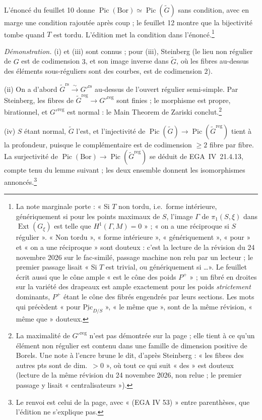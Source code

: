 \documentclass[11pt,a4paper]{article}
\begin{document}
L'énoncé du feuillet 10 donne
$\operatorname{Pic}(\mathrm{Bor})\simeq\operatorname{Pic}(\widetilde{G})$ sans
condition, avec en marge une condition rajoutée après coup ; le feuillet 12
montre que la bijectivité tombe quand $T$ est tordu. L'édition met la condition
dans l'énoncé.\footnote{La note marginale porte : « Si $T$
non tordu, i.e.\ forme intérieure, génériquement si pour les points maximaux
de $S$, l'image $\Gamma$ de $\pi_{1}(S,\xi)$ dans
$\operatorname{Ext}(G_{\xi})$ est telle que $H^{1}(\Gamma,M)=0$ » ; « on a une
réciproque si $S$ régulier ». « Non tordu », « forme intérieure »,
« génériquement », « pour » et « on a une réciproque » sont douteux : c'est la
lecture de la révision du 24 novembre 2026 sur le fac-similé,
passage machine non relu par un lecteur ; le premier passage lisait
« Si $T$ est trivial, ou génériquement si \ldots ». Le feuillet écrit aussi que le cône ample « est
le cône des poids $P^{+}$ » ; un fibré en droites sur la variété des drapeaux
est ample exactement pour les poids \emph{strictement} dominants, $P^{+}$ étant
le cône des fibrés engendrés par leurs sections. Les mots qui précèdent « pour
$\underline{\mathrm{Pic}}_{D/S}$ », « le même que », sont de la même révision,
« même que » douteux.}

\emph{Démonstration.} (i) et (iii) sont connus ; pour (iii), Steinberg (le
lieu non régulier de $G$ est de codimension $3$, et son image inverse dans
$\widetilde{G}$, où les fibres au-dessus des éléments sous-réguliers sont des
courbes, est de codimension $2$).

(ii) On a d'abord $\widetilde{G}^{\mathrm{rs}}\xrightarrow{\sim}
G'^{\mathrm{rs}}$ au-dessus de l'ouvert régulier semi-simple. Par Steinberg,
les fibres de $\widetilde{G}^{\mathrm{reg}}\to G'^{\mathrm{reg}}$ sont finies ;
le morphisme est propre, birationnel, et $G'^{\mathrm{reg}}$ est normal : le
Main Theorem de Zariski conclut.\footnote{La maximalité de
$G'^{\mathrm{reg}}$ n'est pas démontrée sur la page ; elle tient à ce qu'un
élément non régulier est contenu dans une famille de dimension positive de
Borels. Une note à l'encre brune le dit, d'après Steinberg : « les fibres des autres
pts sont de dim.\ $> 0$ », où tout ce qui suit « des » est douteux (lecture de
la même révision du 24 novembre 2026, non relue ; le premier passage y lisait
« centralisateurs »).}

(iv) $S$ étant normal, $\widetilde{G}$ l'est, et l'injectivité de
$\operatorname{Pic}(\widetilde{G})\to\operatorname{Pic}(\widetilde{G}^{\mathrm{reg}})$
tient à la profondeur, puisque le complémentaire est de codimension
$\geqslant 2$ fibre par fibre. La surjectivité de
$\operatorname{Pic}(\mathrm{Bor})\to\operatorname{Pic}(\widetilde{G}^{\mathrm{reg}})$
se déduit de EGA~IV~21.4.13, compte tenu du lemme suivant ; les deux ensemble
donnent les isomorphismes annoncés.\footnote{Le renvoi est celui de la page,
avec « (EGA IV 53) » entre parenthèses, que l'édition ne s'explique pas.}
\end{document}

